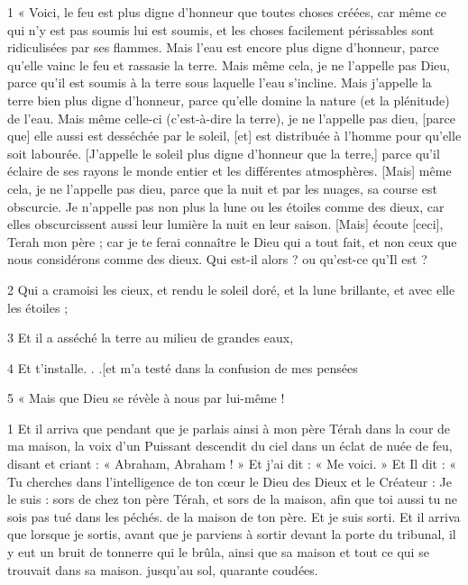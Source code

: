 \par 1 « Voici, le feu est plus digne d'honneur que toutes choses créées, car même ce qui n'y est pas soumis lui est soumis, et les choses facilement périssables sont ridiculisées par ses flammes. Mais l’eau est encore plus digne d’honneur, parce qu’elle vainc le feu et rassasie la terre. Mais même cela, je ne l'appelle pas Dieu, parce qu'il est soumis à la terre sous laquelle l'eau s'incline. Mais j’appelle la terre bien plus digne d’honneur, parce qu’elle domine la nature (et la plénitude) de l’eau. Mais même celle-ci (c'est-à-dire la terre), je ne l'appelle pas dieu, [parce que] elle aussi est desséchée par le soleil, [et] est distribuée à l'homme pour qu'elle soit labourée. [J'appelle le soleil plus digne d'honneur que la terre,] parce qu'il éclaire de ses rayons le monde entier et les différentes atmosphères. [Mais] même cela, je ne l'appelle pas dieu, parce que la nuit et par les nuages, sa course est obscurcie. Je n'appelle pas non plus la lune ou les étoiles comme des dieux, car elles obscurcissent aussi leur lumière la nuit en leur saison. [Mais] écoute [ceci], Terah mon père ; car je te ferai connaître le Dieu qui a tout fait, et non ceux que nous considérons comme des dieux. Qui est-il alors ? ou qu'est-ce qu'Il est ?

\par 2 Qui a cramoisi les cieux, et rendu le soleil doré, et la lune brillante, et avec elle les étoiles ;

\par 3 Et il a asséché la terre au milieu de grandes eaux,

\par 4 Et t'installe. . .[et m'a testé dans la confusion de mes pensées

\par 5 « Mais que Dieu se révèle à nous par lui-même !


\par 1 Et il arriva que pendant que je parlais ainsi à mon père Térah dans la cour de ma maison, la voix d'un Puissant descendit du ciel dans un éclat de nuée de feu, disant et criant : « Abraham, Abraham ! » Et j’ai dit : « Me voici. » Et Il dit : « Tu cherches dans l’intelligence de ton cœur le Dieu des Dieux et le Créateur : Je le suis : sors de chez ton père Térah, et sors de la maison, afin que toi aussi tu ne sois pas tué dans les péchés. de la maison de ton père. Et je suis sorti. Et il arriva que lorsque je sortis, avant que je parviens à sortir devant la porte du tribunal, il y eut un bruit de tonnerre qui le brûla, ainsi que sa maison et tout ce qui se trouvait dans sa maison. jusqu'au sol, quarante coudées.

